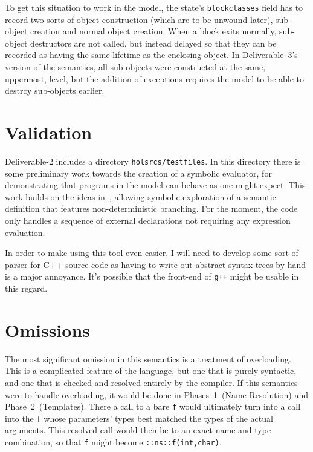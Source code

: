 \documentclass[11pt]{article}
\begin{document}
To get this situation to work in the model, the state's
\texttt{blockclasses} field has to record two sorts of object
construction (which are to be unwound later), sub-object creation and
normal object creation.  When a block exits normally, sub-object
destructors are not called, but instead delayed so that they can be
recorded as having the same lifetime as the enclosing object.  In
Deliverable~3's version of the semantics, all sub-objects were
constructed at the same, uppermost, level, but the addition of
exceptions requires the model to be able to destroy sub-objects
earlier.


\section{Validation}
\label{sec:validation}

Deliverable-2 includes a directory \texttt{holsrcs/testfiles}.  In
this directory there is some preliminary work towards the creation of
a symbolic evaluator, for demonstrating that programs in the model can
behave as one might expect.  This work builds on the ideas
in~\cite{netsem:popl2006}, allowing symbolic exploration of a semantic
definition that features non-deterministic branching.  For the moment,
the code only handles a sequence of external declarations not
requiring any expression evaluation.

In order to make using this tool even easier, I will need to develop
some sort of parser for C++ source code as having to write out
abstract syntax trees by hand is a major annoyance.  It's possible
that the front-end of \texttt{g++} might be usable in this regard.


\section{Omissions}
\label{sec:omissions}

The most significant omission in this semantics is a treatment of
overloading.  This is a complicated feature of the language, but one
that is purely syntactic, and one that is checked and resolved
entirely by the compiler.  If this semantics were to handle
overloading, it would be done in Phases~1~(Name Resolution) and
Phase~2~(Templates).  There a call to a bare \texttt{f} would
ultimately turn into a call into the \texttt{f} whose parameters'
types best matched the types of the actual arguments.  This resolved
call would then be to an exact name and type combination, so that
\texttt{f} might become \texttt{::ns::f(int,char)}.
\end{document}
